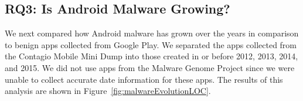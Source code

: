 \documentclass{sig-alternate}
\newcommand{\todo}[1]{\textcolor{cyan}{\textbf{[#1]}}}
\begin{document}
%
%
%
%
%
%
%
%
%
%



\subsection{RQ3: Is Android Malware Growing?}

We next compared how Android malware has grown over the years in comparison to benign apps collected from Google Play. We separated the apps collected from the Contagio Mobile Mini Dump into those created in or before 2012, 2013, 2014, and 2015. We did not use apps from the Malware Genome Project since we were unable to collect accurate date information for these apps. The results of this analysis are shown in Figure~\ref{fig:malwareEvolutionLOC}.
\end{document}
